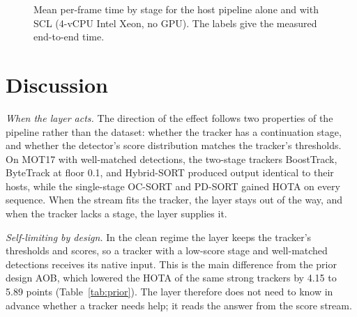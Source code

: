 \documentclass[pdflatex,sn-mathphys-num,iicol]{sn-jnl}
\newcommand{\scl}{SCL}
\newcommand{\aob}{AOB}
\begin{document}
\begin{figure}[t]
\centering
{}
\caption{Mean per-frame time by stage for the host pipeline alone and with
\scl{} (4-vCPU Intel Xeon, no GPU). The labels give the measured
end-to-end time.}
\label{fig:runtime}
\end{figure}
\section{Discussion}\label{sec:discussion}

\emph{When the layer acts.} The direction of the effect follows two
properties of the pipeline rather than the dataset: whether the tracker has a
continuation stage, and whether the detector's score distribution matches the
tracker's thresholds. On MOT17 with well-matched detections, the two-stage
trackers BoostTrack, ByteTrack at floor 0.1, and Hybrid-SORT produced output
identical to their hosts, while the single-stage OC-SORT and PD-SORT gained
HOTA on every sequence. When the stream fits the tracker, the layer stays out
of the way, and when the tracker lacks a stage, the layer supplies it.

\emph{Self-limiting by design.} In the clean regime the layer keeps the
tracker's thresholds and scores, so a tracker with a low-score stage and
well-matched detections receives its native input. This is the main
difference from the prior design \aob{}, which lowered the HOTA of the same strong
trackers by 4.15 to 5.89 points (Table~\ref{tab:prior}). The layer therefore does not
need to know in advance whether a tracker needs help; it reads the answer from
the score stream.
\end{document}

